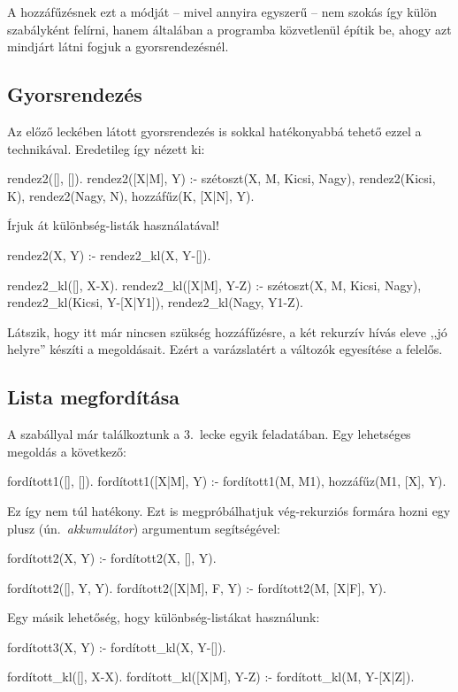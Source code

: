 A hozzáfűzésnek ezt a módját -- mivel annyira
egyszerű -- nem szokás így külön szabályként
felírni, hanem általában a programba közvetlenül
építik be, ahogy azt mindjárt látni fogjuk a
gyorsrendezésnél.

\subsection*{Gyorsrendezés}
Az előző leckében látott gyorsrendezés is sokkal
hatékonyabbá tehető ezzel a technikával. Eredetileg
így nézett ki:
\begin{program}
rendez2([], []).
rendez2([X|M], Y) :-
    szétoszt(X, M, Kicsi, Nagy),
    rendez2(Kicsi, K),
    rendez2(Nagy, N),
    hozzáfűz(K, [X|N], Y).
\end{program}
Írjuk át különbség-listák használatával!
\begin{program}
rendez2(X, Y) :- rendez2_kl(X, Y-[]).

rendez2_kl([], X-X).
rendez2_kl([X|M], Y-Z) :-
    szétoszt(X, M, Kicsi, Nagy),
    rendez2_kl(Kicsi, Y-[X|Y1]),
    rendez2_kl(Nagy, Y1-Z).
\end{program}
Látszik, hogy itt már nincsen szükség hozzáfűzésre,
a két rekurzív hívás eleve ,,jó helyre'' készíti a
megoldásait. Ezért a varázslatért a változók
egyesítése a felelős.

\subsection*{Lista megfordítása}
A  szabállyal már találkoztunk a
3.~lecke egyik feladatában. Egy lehetséges megoldás
a következő:
\begin{program}
fordított1([], []).
fordított1([X|M], Y) :-
    fordított1(M, M1), hozzáfűz(M1, [X], Y).
\end{program}
Ez így nem túl hatékony. Ezt is megpróbálhatjuk
vég-rekurziós formára hozni egy plusz
(ún.~\emph{akkumulátor}) argumentum segítségével:
\begin{program}
fordított2(X, Y) :- fordított2(X, [], Y).

fordított2([], Y, Y).
fordított2([X|M], F, Y) :- fordított2(M, [X|F], Y). 
\end{program}

Egy másik lehetőség, hogy különbség-listákat
használunk:
\begin{program}
fordított3(X, Y) :- fordított_kl(X, Y-[]).

fordított_kl([], X-X).
fordított_kl([X|M], Y-Z) :- fordított_kl(M, Y-[X|Z]).
\end{program}

